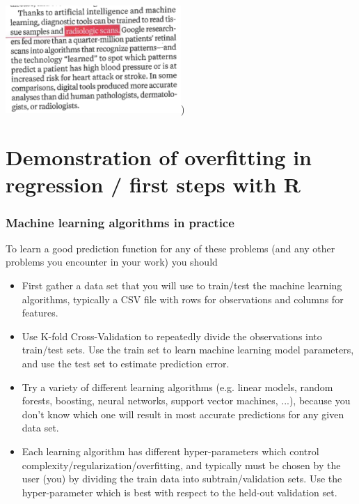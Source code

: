 \documentclass{beamer}
\begin{document}
\begin{frame}
{\includegraphics[width=0.5\textwidth]{retinal-scans/national-geographic-medicine-paragraph})
}

\end{frame}

\section{Demonstration of overfitting in regression /
  first steps with R}
 
\begin{frame}
  \frametitle{Machine learning algorithms in practice}

  To learn a good prediction function for any of these problems (and
  any other problems you encounter in your work) you should
  \begin{itemize}
  \item First gather a data set that you will use to train/test the
    machine learning algorithms, typically a CSV file with rows for
    observations and columns for features.
  \item Use K-fold Cross-Validation to repeatedly divide the
    observations into train/test sets. Use the train set to learn
    machine learning model parameters, and use the test set to
    estimate prediction error.
  \item Try a variety of different learning algorithms (e.g. linear
    models, random forests, boosting, neural networks, support vector
    machines, ...), because you don't know which one will result in
    most accurate predictions for any given data set. 
  \item Each learning algorithm has different hyper-parameters which
    control complexity/regularization/overfitting, and typically must
    be chosen by the user (you) by dividing the train data into
    subtrain/validation sets. Use the hyper-parameter which is
    best with respect to the held-out validation set.
  \end{itemize}
  
\end{frame}
\end{document}
